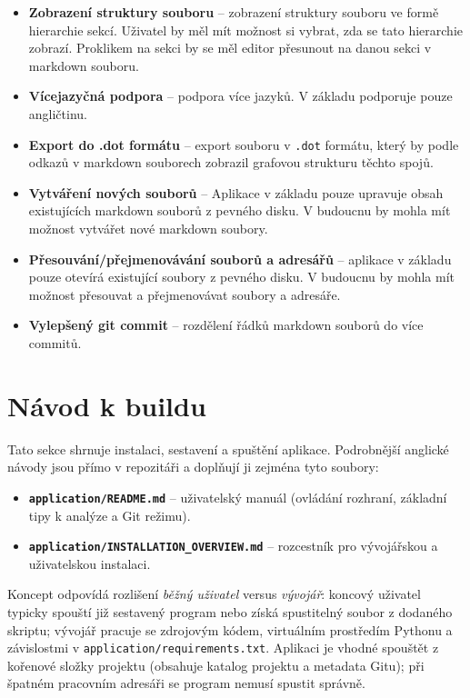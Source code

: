 \documentclass[12pt, a4paper]{article}
\begin{document}
\begin{itemize}
    \item \textbf{Zobrazení struktury souboru} -- zobrazení struktury 
    souboru ve formě hierarchie sekcí. Uživatel by měl mít možnost si vybrat, zda se tato hierarchie zobrazí.
    Proklikem na sekci by se měl editor přesunout na danou sekci v markdown souboru.
    \item \textbf{Vícejazyčná podpora} -- podpora více jazyků. V základu podporuje pouze angličtinu.
    \item \textbf{Export do .dot formátu} -- export souboru v \texttt{.dot} formátu,
    který by podle odkazů v markdown souborech zobrazil grafovou strukturu těchto spojů.
    \item \textbf{Vytváření nových souborů} -- Aplikace v základu pouze upravuje obsah existujících markdown souborů z pevného disku.
    V budoucnu by mohla mít možnost vytvářet nové markdown soubory.
    \item \textbf{Přesouvání/přejmenovávání souborů a adresářů} -- aplikace v základu pouze otevírá existující soubory z pevného disku.
    V budoucnu by mohla mít možnost přesouvat a přejmenovávat soubory a adresáře.
    \item \textbf{Vylepšený git commit} -- rozdělení řádků markdown souborů do více commitů.
\end{itemize}

\section{Návod k buildu}

Tato sekce shrnuje instalaci, sestavení a spuštění aplikace. Podrobnější anglické návody jsou přímo v repozitáři a doplňují ji zejména tyto soubory:

\begin{itemize}
    \item \textbf{\texttt{application/README.md}} -- uživatelský manuál (ovládání rozhraní, základní tipy k analýze a Git režimu).
    \item \textbf{\texttt{application/INSTALLATION\_OVERVIEW.md}} -- rozcestník pro vývojářskou a uživatelskou instalaci.
\end{itemize}

Koncept odpovídá rozlišení \emph{běžný uživatel} versus \emph{vývojář}: koncový uživatel typicky spouští již sestavený program nebo získá spustitelný soubor z dodaného skriptu; vývojář pracuje se zdrojovým kódem, virtuálním prostředím Pythonu a závislostmi v \texttt{application/requirements.txt}. Aplikaci je vhodné spouštět z kořenové složky projektu (obsahuje katalog projektu a metadata Gitu); při špatném pracovním adresáři se program nemusí spustit správně.
\end{document}
